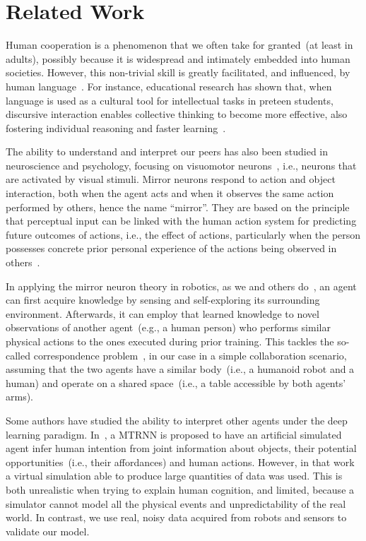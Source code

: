 
\section{Related Work}
\label{sec:related_work}

Human cooperation is a phenomenon that we often take for granted~(at least in adults), possibly because it is widespread and intimately embedded into human societies.
However, this non-trivial skill is greatly facilitated, and influenced, by human language~\cite{mueller:2000:psych}.
For instance, educational research has shown that, when language is used as a cultural tool for intellectual tasks in preteen students, discursive interaction enables collective thinking to become more effective, also fostering individual reasoning and faster learning~\cite{rojas:2003:ijer}.

The ability to understand and interpret our peers has also been studied in neuroscience and psychology, focusing on visuomotor neurons~\cite{rizzolatti:2001:nrn}, i.e., neurons that are activated by visual stimuli.
Mirror neurons respond to action and object interaction, both when the agent acts and when it observes the same action performed by others, hence the name ``mirror''.
They are based on the principle that perceptual input can be linked with the human action system for predicting future outcomes of actions, i.e., the effect of actions, particularly when the person possesses concrete prior personal experience of the actions being observed in others~\cite{aglioti:2008:basketball,knoblich:2001:psychsci}.

In applying the mirror neuron theory in robotics, as we and others do~\cite{gazzola:2007:neuroimage,lopes:2009:ab}, an agent can first acquire knowledge by sensing and self-exploring its surrounding environment.
Afterwards, it can employ that learned knowledge to novel observations of another agent~(e.g., a human person) who performs similar physical actions to the ones executed during prior training.
This tackles the so-called correspondence problem~\cite{nehaniv:2002:correspondence}, in our case in a simple collaboration scenario, assuming that the two agents have a similar body~(i.e., a humanoid robot and a human) and operate on a shared space~(i.e., a table accessible by both agents' arms).

Some authors have studied the ability to interpret other agents under the deep learning paradigm.
In~\cite{kim:2017:nn}, a \ac{MTRNN} is proposed to have an artificial simulated agent infer human intention from joint information about objects, their potential opportunities~(i.e., their affordances) and human actions.
However, in that work a virtual simulation able to produce large quantities of data was used.
This is both unrealistic when trying to explain human cognition, and limited, because a simulator cannot model all the physical events and unpredictability of the real world.
In contrast, we use real, noisy data acquired from robots and sensors to validate our model.

